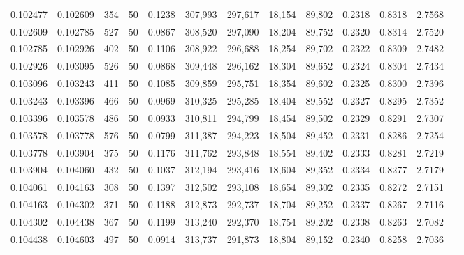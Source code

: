 \begin{tabular}{rrrrrrrrrrrrr}
0.102477 & 0.102609 &   354 &  50 &                                     0.1238 & 307,993 & 297,617 &  18,154 &  89,802 & 0.2318 & 0.8318 & 2.7568 \\
0.102609 & 0.102785 &   527 &  50 &                                     0.0867 & 308,520 & 297,090 &  18,204 &  89,752 & 0.2320 & 0.8314 & 2.7520 \\
0.102785 & 0.102926 &   402 &  50 &                                     0.1106 & 308,922 & 296,688 &  18,254 &  89,702 & 0.2322 & 0.8309 & 2.7482 \\
0.102926 & 0.103095 &   526 &  50 &                                     0.0868 & 309,448 & 296,162 &  18,304 &  89,652 & 0.2324 & 0.8304 & 2.7434 \\
0.103096 & 0.103243 &   411 &  50 &                                     0.1085 & 309,859 & 295,751 &  18,354 &  89,602 & 0.2325 & 0.8300 & 2.7396 \\
0.103243 & 0.103396 &   466 &  50 &                                     0.0969 & 310,325 & 295,285 &  18,404 &  89,552 & 0.2327 & 0.8295 & 2.7352 \\
0.103396 & 0.103578 &   486 &  50 &                                     0.0933 & 310,811 & 294,799 &  18,454 &  89,502 & 0.2329 & 0.8291 & 2.7307 \\
0.103578 & 0.103778 &   576 &  50 &                                     0.0799 & 311,387 & 294,223 &  18,504 &  89,452 & 0.2331 & 0.8286 & 2.7254 \\
0.103778 & 0.103904 &   375 &  50 &                                     0.1176 & 311,762 & 293,848 &  18,554 &  89,402 & 0.2333 & 0.8281 & 2.7219 \\
0.103904 & 0.104060 &   432 &  50 &                                     0.1037 & 312,194 & 293,416 &  18,604 &  89,352 & 0.2334 & 0.8277 & 2.7179 \\
0.104061 & 0.104163 &   308 &  50 &                                     0.1397 & 312,502 & 293,108 &  18,654 &  89,302 & 0.2335 & 0.8272 & 2.7151 \\
0.104163 & 0.104302 &   371 &  50 &                                     0.1188 & 312,873 & 292,737 &  18,704 &  89,252 & 0.2337 & 0.8267 & 2.7116 \\
0.104302 & 0.104438 &   367 &  50 &                                     0.1199 & 313,240 & 292,370 &  18,754 &  89,202 & 0.2338 & 0.8263 & 2.7082 \\
0.104438 & 0.104603 &   497 &  50 &                                     0.0914 & 313,737 & 291,873 &  18,804 &  89,152 & 0.2340 & 0.8258 & 2.7036 \\

\end{tabular}
